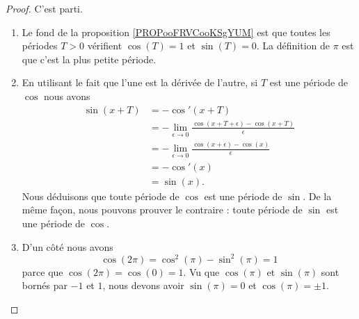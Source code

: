 \begin{proof}
    C'est parti.
    \begin{enumerate}
        \item
            Le fond de la proposition \ref{PROPooFRVCooKSgYUM} est que toutes les périodes \( T>0\) vérifient \( \cos(T)=1\) et \( \sin(T)=0\). La définition de \( \pi\) est que c'est la plus petite période.
        \item
            En utilisant le fait que l'une est la dérivée de l'autre, si \( T\) est une période de \( \cos\) nous avons
            \begin{subequations}
                \begin{align}
                    \sin(x+T)&=-\cos'(x+T)\\
                    &=-\lim_{\epsilon\to 0}\frac{ \cos(x+T+\epsilon)-\cos(x+T) }{\epsilon  }\\
                    &=-\lim_{\epsilon\to 0}\frac{ \cos(x+\epsilon)-\cos(x) }{ \epsilon }\\
                    &=-\cos'(x)\\
                    &=\sin(x).
                \end{align}
            \end{subequations}
            Nous déduisons que toute période de \( \cos\) est une période de \( \sin\). De la même façon, nous pouvons prouver le contraire : toute période de \( \sin\) est une période de \( \cos\).
        \item
            D'un côté nous avons
            \begin{equation}
                \cos(2\pi)=\cos^2(\pi)-\sin^2(\pi)=1
            \end{equation}
            parce que \( \cos(2\pi)=\cos(0)=1\). Vu que \( \cos(\pi)\) et \( \sin(\pi)\) sont bornés par \( -1\) et \( 1\), nous devons avoir \( \sin(\pi)=0\) et \( \cos(\pi)=\pm 1\).


\end{enumerate}
\end{proof}
